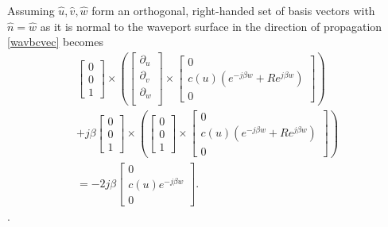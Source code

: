 Assuming $\hat{u},\hat{v},\hat{w}$ form an orthogonal, right-handed set of basis vectors with $\hat{n}=\hat{w}$ as it is normal to the waveport surface in the direction of propagation \ref*{wavbcvec} becomes
\begin{multline}
    \begin{bmatrix}
        0 \\ 0 \\ 1
    \end{bmatrix} \times \left(
        \begin{bmatrix}
            \partial_u \\ 
            \partial_v \\
            \partial_w \\ 
        \end{bmatrix} \times 
    \begin{bmatrix}
        0 \\
        c(u)(e^{-j\beta w}+Re^{j\beta w})\\
        0
    \end{bmatrix}\right) \\ +j\beta 
    \begin{bmatrix}
        0 \\ 0 \\ 1
    \end{bmatrix} \times \left(
        \begin{bmatrix}
            0 \\ 0 \\ 1
        \end{bmatrix} \times 
    \begin{bmatrix}
        0 \\
        c(u)(e^{-j\beta w}+Re^{j\beta w})\\
        0
    \end{bmatrix}\right) \\ =-2j\beta
    \begin{bmatrix}
        0 \\
        c(u)e^{-j\beta w}\\
        0
    \end{bmatrix}.
\end{multline}.

